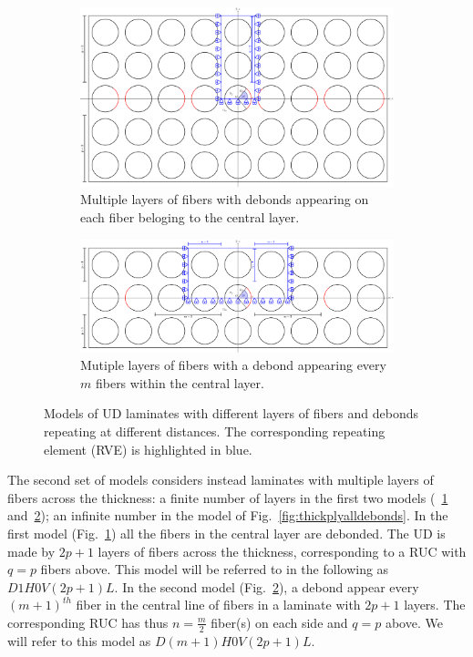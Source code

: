 \documentclass[review]{elsarticle}
\begin{document}
\begin{figure}[!h]
\centering
    \begin{subfigure}[b]{\textwidth}
    \centering
        \includegraphics[height=0.3\textheight]{thickPlycentraldebondsline.pdf}
        \caption{Multiple layers of fibers with debonds appearing on each fiber beloging to the central layer.}\label{subfig:thickplycentraldebonds}
    \end{subfigure} 

    \begin{subfigure}[b]{\textwidth}
        \includegraphics[width=\textwidth]{thickPly.pdf}
        \caption{Mutiple layers of fibers with a debond appearing every $m$ fibers within the central layer.}\label{subfig:thickply}
    \end{subfigure} 

\caption{Models of UD laminates with different layers of fibers and debonds repeating at different distances. The corresponding repeating element (RVE) is highlighted in blue.}\label{fig:laminateModelsB}
\end{figure}

The second set of models considers instead laminates with multiple layers of fibers across the thickness: a finite number of layers in the first two models (~\ref{subfig:thickplycentraldebonds} and~\ref{subfig:thickply}); an infinite number in the model of Fig.~\ref{fig:thickplyalldebonds}. In the first model (Fig.~\ref{subfig:thickplycentraldebonds}) all the fibers in the central layer are debonded. The UD is made by $2p+1$ layers of fibers across the thickness, corresponding to a RUC with $q=p$ fibers above. This model will be referred to in the following as $D1H0V\left(2p+1\right)L$. In the second model (Fig.~\ref{subfig:thickply}), a debond appear every $\left(m+1\right)^{th}$ fiber in the central line of fibers in a laminate with $2p+1$ layers. The corresponding RUC has thus $n=\frac{m}{2}$ fiber(s) on each side and $q=p$ above. We will refer to this model as $D\left(m+1\right)H0V\left(2p+1\right)L$.
\end{document}
